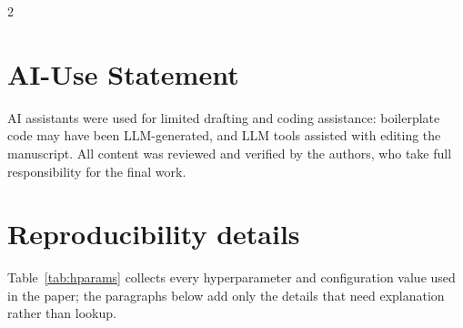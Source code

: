 \documentclass[9pt]{article}
\begin{document}
\begin{multicols}{2}



\end{multicols}

\startappendix

\section*{AI-Use Statement}

AI assistants were used for limited drafting and coding assistance:
boilerplate code may have been LLM-generated, and LLM tools assisted with
editing the manuscript. All content was reviewed and verified by the authors,
who take full responsibility for the final work.

\section{Reproducibility details}\label{app:repro}

Table~\ref{tab:hparams} collects every hyperparameter and configuration
value used in the paper; the paragraphs below add only the details that need
explanation rather than lookup.
\end{document}
